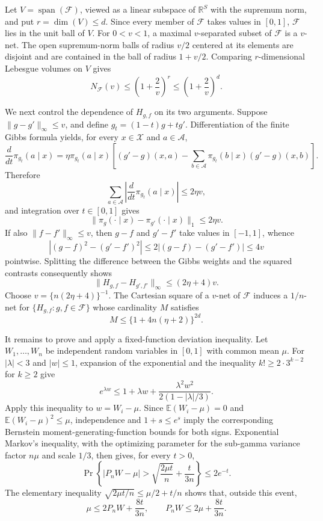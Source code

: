 Let \(V=\operatorname{span}(\mathcal F)\), viewed as a linear subspace of \(\mathbb R^S\) with the supremum norm, and put \(r=\dim(V)\le d\). Since every member of \(\mathcal F\) takes values in \([0,1]\), \(\mathcal F\) lies in the unit ball of \(V\). For \(0<v<1\), a maximal \(v\)-separated subset of \(\mathcal F\) is a \(v\)-net. The open supremum-norm balls of radius \(v/2\) centered at its elements are disjoint and are contained in the ball of radius \(1+v/2\). Comparing \(r\)-dimensional Lebesgue volumes on \(V\) gives
\[
N_{\mathcal F}(v)\le \left(1+\frac{2}{v}\right)^r\le \left(1+\frac{2}{v}\right)^d.
\]

We next control the dependence of \(H_{g,f}\) on its two arguments. Suppose \(\lVert g-g'\rVert_\infty\le v\), and define \(g_t=(1-t)g+tg'\). Differentiation of the finite Gibbs formula yields, for every \(x\in\mathcal X\) and \(a\in\mathcal A\),
\[
\frac{d}{dt}\pi_{g_t}(a\mid x)
=\eta\pi_{g_t}(a\mid x)\left[(g'-g)(x,a)-\sum_{b\in\mathcal A}\pi_{g_t}(b\mid x)(g'-g)(x,b)\right].
\]
Therefore
\[
\sum_{a\in\mathcal A}\left|\frac{d}{dt}\pi_{g_t}(a\mid x)\right|\le 2\eta v,
\]
and integration over \(t\in[0,1]\) gives
\[
\lVert\pi_g(\cdot\mid x)-\pi_{g'}(\cdot\mid x)\rVert_1\le2\eta v.
\]
If also \(\lVert f-f'\rVert_\infty\le v\), then \(g-f\) and \(g'-f'\) take values in \([-1,1]\), whence
\[
\left|(g-f)^2-(g'-f')^2\right|
\le2\left|(g-f)-(g'-f')\right|\le4v
\]
pointwise. Splitting the difference between the Gibbs weights and the squared contrasts consequently shows
\[
\lVert H_{g,f}-H_{g',f'}\rVert_\infty\le(2\eta+4)v.
\]
Choose \(v=\{n(2\eta+4)\}^{-1}\). The Cartesian square of a \(v\)-net of \(\mathcal F\) induces a \(1/n\)-net for \(\{H_{g,f}:g,f\in\mathcal F\}\) whose cardinality \(M\) satisfies
\[
M\le\{1+4n(\eta+2)\}^{2d}.
\]

It remains to prove and apply a fixed-function deviation inequality. Let \(W_1,\ldots,W_n\) be independent random variables in \([0,1]\) with common mean \(\mu\). For \(|\lambda|<3\) and \(|w|\le1\), expansion of the exponential and the inequality \(k!\ge2\cdot3^{k-2}\) for \(k\ge2\) give
\[
e^{\lambda w}\le1+\lambda w+\frac{\lambda^2w^2}{2(1-|\lambda|/3)}.
\]
Apply this inequality to \(w=W_i-\mu\). Since \(\mathbb E(W_i-\mu)=0\) and \(\mathbb E(W_i-\mu)^2\le\mu\), independence and \(1+s\le e^s\) imply the corresponding Bernstein moment-generating-function bounds for both signs. Exponential Markov's inequality, with the optimizing parameter for the sub-gamma variance factor \(n\mu\) and scale \(1/3\), then gives, for every \(t>0\),
\[
\Pr\left\{\left|P_nW-\mu\right|>\sqrt{\frac{2\mu t}{n}}+\frac{t}{3n}\right\}\le2e^{-t}.
\]
The elementary inequality \(\sqrt{2\mu t/n}\le\mu/2+t/n\) shows that, outside this event,
\[
\mu\le2P_nW+\frac{8t}{3n},
\qquad
P_nW\le2\mu+\frac{8t}{3n}.
\]

